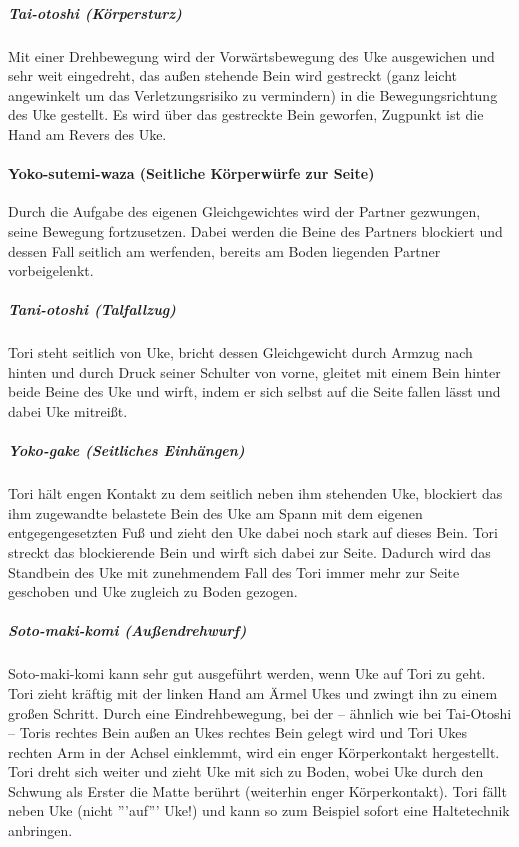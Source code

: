 \documentclass[justified, a4paper, notitlepage, captions=tableheading, nobib]{tufte-handout}
\begin{document}
\subparagraph{Tai-otoshi (Körpersturz)}
\label{sec:org8b796b5}
Mit einer Drehbewegung wird der Vorwärtsbewegung des Uke ausgewichen und sehr weit eingedreht, das außen stehende Bein wird gestreckt (ganz leicht angewinkelt um das Verletzungsrisiko zu vermindern) in die Bewegungsrichtung des Uke gestellt. Es wird über das gestreckte Bein geworfen, Zugpunkt ist die Hand am Revers des Uke.

\paragraph{Yoko-sutemi-waza (Seitliche Körperwürfe zur Seite)}
\label{sec:org4439430}

Durch die Aufgabe des eigenen Gleichgewichtes wird der Partner gezwungen, seine Bewegung fortzusetzen. Dabei werden die Beine des Partners blockiert und dessen Fall seitlich am werfenden, bereits am Boden liegenden Partner vorbeigelenkt. 

\subparagraph{Tani-otoshi (Talfallzug)}
\label{sec:orgf067697}
Tori steht seitlich von Uke, bricht dessen Gleichgewicht durch Armzug nach hinten und durch Druck seiner Schulter von vorne, gleitet mit einem Bein hinter beide Beine des Uke und wirft, indem er sich selbst auf die Seite fallen lässt und dabei Uke mitreißt.

\subparagraph{Yoko-gake (Seitliches Einhängen)}
\label{sec:org34091a4}
Tori hält engen Kontakt zu dem seitlich neben ihm stehenden Uke, blockiert das ihm zugewandte belastete Bein des Uke am Spann mit dem eigenen entgegengesetzten Fuß und zieht den Uke dabei noch stark auf dieses Bein. Tori streckt das blockierende Bein und wirft sich dabei zur Seite. Dadurch wird das Standbein des Uke mit zunehmendem Fall des Tori immer mehr zur Seite geschoben und Uke zugleich zu Boden gezogen.

\subparagraph{Soto-maki-komi (Außendrehwurf)}
\label{sec:org7097a23}

Soto-maki-komi kann sehr gut ausgeführt werden, wenn Uke auf Tori zu geht. Tori zieht kräftig mit der linken Hand am Ärmel Ukes und zwingt ihn zu einem großen Schritt. Durch eine Eindrehbewegung, bei der – ähnlich wie bei Tai-Otoshi – Toris rechtes Bein außen an Ukes rechtes Bein gelegt wird und Tori Ukes rechten Arm in der Achsel einklemmt, wird ein enger Körperkontakt hergestellt. Tori dreht sich weiter und zieht Uke mit sich zu Boden, wobei Uke durch den Schwung als Erster die Matte berührt (weiterhin enger Körperkontakt). Tori fällt neben Uke (nicht '''auf''' Uke!) und kann so zum Beispiel sofort eine Haltetechnik anbringen.
\end{document}
